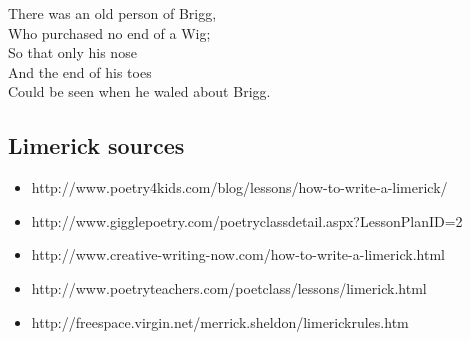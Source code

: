 There was an old person of Brigg,\\
Who purchased no end of a Wig;\\
So that only his nose\\
And the end of his toes\\
Could be seen when he waled about Brigg.\\

\subsection{Limerick sources}
\label{sec:app-source}
\begin{itemize}
\item{http://www.poetry4kids.com/blog/lessons/how-to-write-a-limerick/}
\item{http://www.gigglepoetry.com/poetryclassdetail.aspx?LessonPlanID=2}
\item{http://www.creative-writing-now.com/how-to-write-a-limerick.html}
\item{http://www.poetryteachers.com/poetclass/lessons/limerick.html}
\item{http://freespace.virgin.net/merrick.sheldon/limerickrules.htm}
\end{itemize}


